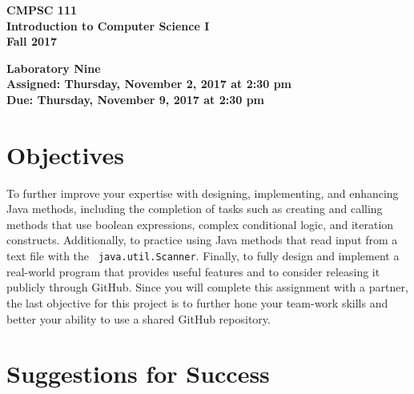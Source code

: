\documentclass[11pt]{article}
\newcommand{\assignmentduedate}{November 9}
\newcommand{\assignmentassignedate}{November 2}
\newcommand{\assignmentnumber}{Nine}
\newcommand{\labyear}{2017}
\newcommand{\labday}{Thursday}
\newcommand{\labtime}{2:30 pm}
\newcommand{\assigneddate}{Assigned: \labday, \assignmentassignedate, \labyear{} at \labtime{}}
\newcommand{\duedate}{Due: \labday, \assignmentduedate, \labyear{} at \labtime{}}
\newcommand{\labtitle}[1]
{
  \begin{center}
    \begin{center}
      \bf
      CMPSC 111\\Introduction to Computer Science I\\
      Fall 2017\\
      \medskip
    \end{center}
    \bf
    #1
  \end{center}
}
\begin{document}
\thispagestyle{empty}

\labtitle{Laboratory \assignmentnumber{} \\ \assigneddate{} \\ \duedate{}}

\section*{Objectives}

To further improve your expertise with designing, implementing, and enhancing Java methods, including the completion of
tasks such as creating and calling methods that use boolean expressions, complex conditional logic, and iteration
constructs. Additionally, to practice using Java methods that read input from a text file with the {\tt
java.util.Scanner}. Finally, to fully design and implement a real-world program that provides useful features and to
consider releasing it publicly through GitHub. Since you will complete this assignment with a partner, the last
objective for this project is to further hone your team-work skills and better your ability to use a shared GitHub
repository.

\section*{Suggestions for Success}
\end{document}
